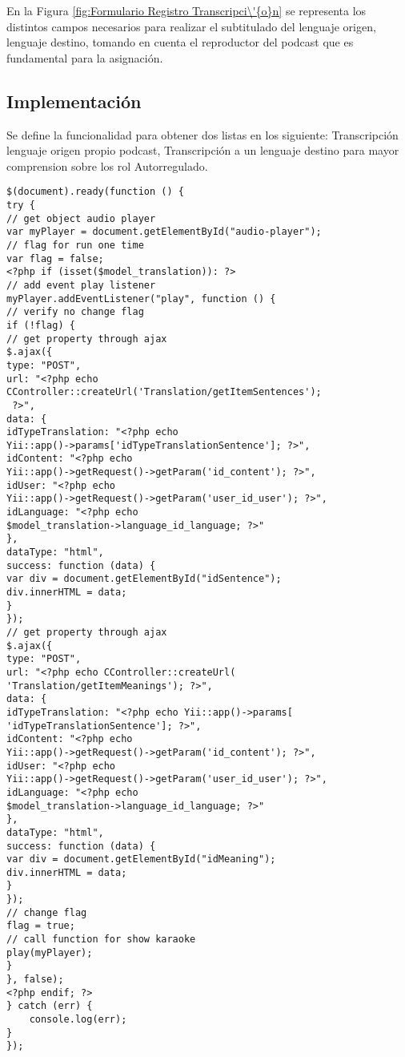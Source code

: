 En la Figura \ref{fig:Formulario Registro Transcripci\'{o}n} se representa los 
distintos campos necesarios para realizar el subtitulado del lenguaje origen, 
lenguaje destino, tomando en cuenta el reproductor del podcast que es fundamental
para la asignaci\'{o}n.

\begin{minipage}{1.0\textwidth}
	\centering
	\label{fig:Formulario Registro Transcripci\'{o}n}
\end{minipage}


\subsection{Implementaci\'{o}n}

Se define la funcionalidad para obtener dos listas en los siguiente: 
Transcripci\'{o}n lenguaje origen propio podcast, Transcripci\'{o}n
a un lenguaje destino para mayor comprension sobre los rol Autorregulado.

\begin{lstlisting}[]
$(document).ready(function () {
try {
// get object audio player
var myPlayer = document.getElementById("audio-player");
// flag for run one time
var flag = false;
<?php if (isset($model_translation)): ?>
// add event play listener
myPlayer.addEventListener("play", function () {
// verify no change flag
if (!flag) {
// get property through ajax
$.ajax({
type: "POST",
url: "<?php echo CController::createUrl('Translation/getItemSentences');
 ?>",
data: {
idTypeTranslation: "<?php echo 
Yii::app()->params['idTypeTranslationSentence']; ?>",
idContent: "<?php echo 
Yii::app()->getRequest()->getParam('id_content'); ?>",
idUser: "<?php echo 
Yii::app()->getRequest()->getParam('user_id_user'); ?>",
idLanguage: "<?php echo 
$model_translation->language_id_language; ?>"
},
dataType: "html",
success: function (data) {
var div = document.getElementById("idSentence");
div.innerHTML = data;
}
});
// get property through ajax
$.ajax({
type: "POST",
url: "<?php echo CController::createUrl(
'Translation/getItemMeanings'); ?>",
data: {
idTypeTranslation: "<?php echo Yii::app()->params[
'idTypeTranslationSentence']; ?>",
idContent: "<?php echo 
Yii::app()->getRequest()->getParam('id_content'); ?>",
idUser: "<?php echo 
Yii::app()->getRequest()->getParam('user_id_user'); ?>",
idLanguage: "<?php echo 
$model_translation->language_id_language; ?>"
},
dataType: "html",
success: function (data) {
var div = document.getElementById("idMeaning");
div.innerHTML = data;
}
});
// change flag
flag = true;
// call function for show karaoke
play(myPlayer);
}
}, false);
<?php endif; ?>
} catch (err) {
    console.log(err);
}
});
\end{lstlisting}

